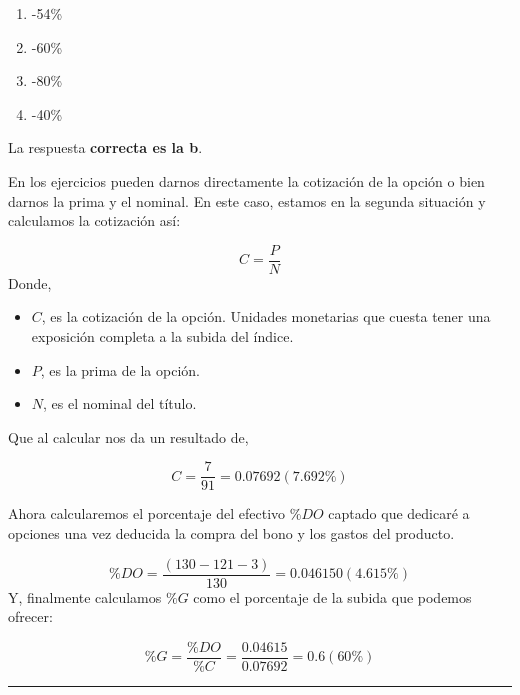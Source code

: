 \documentclass[
  letterpaper,
  DIV=11,
  numbers=noendperiod]{scrreprt}
\begin{document}
\begin{enumerate}
\def\labelenumi{\alph{enumi})}
\item
  -54\%
\item
  -60\%
\item
  -80\%
\item
  -40\%
\end{enumerate}

\begin{tcolorbox}[enhanced jigsaw, left=2mm, opacityback=0, colback=white, breakable, arc=.35mm, bottomrule=.15mm, rightrule=.15mm, toprule=.15mm, leftrule=.75mm, colframe=quarto-callout-tip-color-frame]
\begin{minipage}[t]{5.5mm}
\textcolor{quarto-callout-tip-color}{\faLightbulb}
\end{minipage}%
\begin{minipage}[t]{\textwidth - 5.5mm}

La respuesta \textbf{correcta es la b}.

En los ejercicios pueden darnos directamente la cotización de la opción
o bien darnos la prima y el nominal. En este caso, estamos en la segunda
situación y calculamos la cotización así:

\[C=\frac{P}{N}\] Donde,

\begin{itemize}
\item
  \(C\), es la cotización de la opción. Unidades monetarias que cuesta
  tener una exposición completa a la subida del índice.
\item
  \(P\), es la prima de la opción.
\item
  \(N\), es el nominal del título.
\end{itemize}

Que al calcular nos da un resultado de,

\[C=\frac{7}{91}=0.07692(7.692\%)\]

Ahora calcularemos el porcentaje del efectivo \(\%DO\) captado que
dedicaré a opciones una vez deducida la compra del bono y los gastos del
producto.

\[\%DO=\frac{(130-121-3)}{130}=0.046150(4.615\%)\] Y, finalmente
calculamos \(\%G\) como el porcentaje de la subida que podemos ofrecer:

\[\%G=\frac{\%DO}{\%C}=\frac{0.04615}{0.07692}=0.6(60\%)\]

\end{minipage}%
\end{tcolorbox}

\begin{center}\rule{0.5\linewidth}{0.5pt}\end{center}
\end{document}
